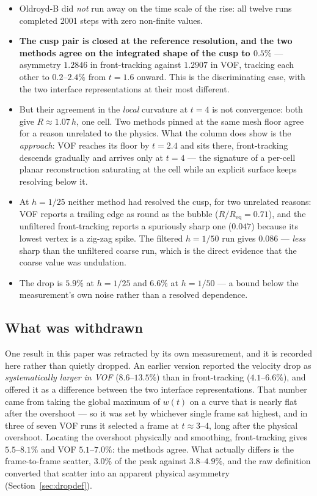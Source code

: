 \begin{itemize}
\item Oldroyd-B did \emph{not} run away on the time scale of the rise: all
twelve runs completed 2001 steps with zero non-finite values.
\item \textbf{The cusp pair is closed at the reference resolution, and the two
methods agree on the integrated shape of the cusp to $0.5\%$} --- asymmetry
$1.2846$ in front-tracking against $1.2907$ in VOF, tracking each other to
$0.2$--$2.4\%$ from $t=1.6$ onward. This is the discriminating case, with the
two interface representations at their most different.
\item But their agreement in the \emph{local} curvature at $t=4$ is not
convergence: both give $R \approx 1.07\,h$, one cell. Two methods pinned at the
same mesh floor agree for a reason unrelated to the physics. What the column
does show is the \emph{approach}: VOF reaches its floor by $t=2.4$ and sits
there, front-tracking descends gradually and arrives only at $t=4$ --- the
signature of a per-cell planar reconstruction saturating at the cell while an
explicit surface keeps resolving below it.
\item At $h=1/25$ neither method had resolved the cusp, for two unrelated
reasons: VOF reports a trailing edge as round as the bubble ($R/R_{\mathrm{eq}}
= 0.71$), and the unfiltered front-tracking reports a spuriously sharp one
($0.047$) because its lowest vertex is a zig-zag spike. The filtered $h=1/50$
run gives $0.086$ --- \emph{less} sharp than the unfiltered coarse run, which is
the direct evidence that the coarse value was undulation.
\item The drop is $5.9\%$ at $h=1/25$ and $6.6\%$ at $h=1/50$ --- a bound below
the measurement's own noise rather than a resolved dependence.
\end{itemize}

\subsection*{What was withdrawn}

One result in this paper was retracted by its own measurement, and it is recorded
here rather than quietly dropped. An earlier version reported the velocity drop
as \emph{systematically larger in VOF} ($8.6$--$13.5\%$) than in front-tracking
($4.1$--$6.6\%$), and offered it as a difference between the two interface
representations. That number came from taking the global maximum of $w(t)$ on a
curve that is nearly flat after the overshoot --- so it was set by whichever
single frame sat highest, and in three of seven VOF runs it selected a frame at
$t \approx 3$--$4$, long after the physical overshoot. Locating the overshoot
physically and smoothing, front-tracking gives $5.5$--$8.1\%$ and VOF
$5.1$--$7.0\%$: the methods agree. What actually differs is the frame-to-frame
scatter, $3.0\%$ of the peak against $3.8$--$4.9\%$, and the raw definition
converted that scatter into an apparent physical asymmetry
(Section~\ref{sec:dropdef}).

